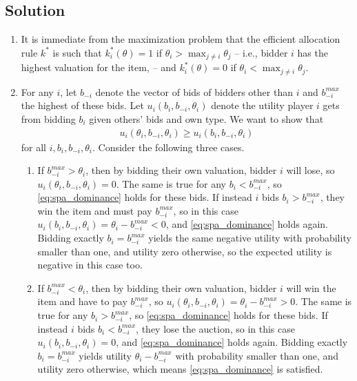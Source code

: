 \documentclass[a4paper]{article}
\begin{document}
\subsection{Solution}
\begin{enumerate}
	\item It is immediate from the maximization problem that the efficient allocation rule $k^*$ is such that $k^*_i(\theta) = 1$ if $\theta_i > \max_{j \neq i} \theta_j$ -- i.e., bidder $i$ has the highest valuation for the item, -- and $k^*_i(\theta) = 0$ if $\theta_i < \max_{j \neq i} \theta_j$.
	
	\item For any $i$, let $b_{-i}$ denote the vector of bids of bidders other than $i$ and $b^{max}_{-i}$ the highest of these bids. Let $u_i(b_i,b_{-i},\theta_i)$ denote the utility player $i$ gets from bidding $b_i$ given others' bids and own type. We want to show that
	\begin{align} \label{eq:spa_dominance}
		u_i(\theta_i, b_{-i}, \theta_i) \geq u_i(b_i, b_{-i}, \theta_i)
	\end{align}
	for all $i, b_i, b_{-i}, \theta_i$.
	Consider the following three cases.
	\begin{enumerate}
		\item If $b^{max}_{-i} > \theta_i$, then by bidding their own valuation, bidder $i$ will lose, so $u_i(\theta_i, b_{-i}, \theta_i) = 0$. The same is true for any $b_i < b^{max}_{-i}$, so \eqref{eq:spa_dominance} holds for these bids. If instead $i$ bids $b_i > b^{max}_{-i}$, they win the item and must pay $b^{max}_{-i}$, so in this case $u_i(b_i, b_{-i}, \theta_i) = \theta_i - b^{max}_{-i} < 0$, and \eqref{eq:spa_dominance} holds again. Bidding exactly $b_i = b^{max}_{-i}$ yields the same negative utility with probability smaller than one, and utility zero otherwise, so the expected utility is negative in this case too.
		
		\item If $b^{max}_{-i} < \theta_i$, then by bidding their own valuation, bidder $i$ will win the item and have to pay $b^{max}_{-i}$, so $u_i(\theta_i, b_{-i}, \theta_i) = \theta_i - b^{max}_{-i} > 0$. The same is true for any $b_i > b^{max}_{-i}$, so \eqref{eq:spa_dominance} holds for these bids. If instead $i$ bids $b_i < b^{max}_{-i}$, they lose the auction, so in this case $u_i(b_i, b_{-i}, \theta_i) = 0$, and \eqref{eq:spa_dominance} holds again. Bidding exactly $b_i = b^{max}_{-i}$ yields utility $\theta_i - b^{max}_{-i}$ with probability smaller than one, and utility zero otherwise, which means \eqref{eq:spa_dominance} is satisfied.
		

\end{enumerate}
\end{enumerate}
\end{document}
